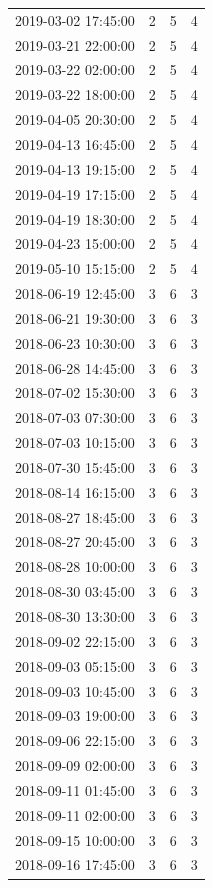 \begin{tabular}{lrrr}
2019-03-02 17:45:00 & 2 & 5 & 4 \\
2019-03-21 22:00:00 & 2 & 5 & 4 \\
2019-03-22 02:00:00 & 2 & 5 & 4 \\
2019-03-22 18:00:00 & 2 & 5 & 4 \\
2019-04-05 20:30:00 & 2 & 5 & 4 \\
2019-04-13 16:45:00 & 2 & 5 & 4 \\
2019-04-13 19:15:00 & 2 & 5 & 4 \\
2019-04-19 17:15:00 & 2 & 5 & 4 \\
2019-04-19 18:30:00 & 2 & 5 & 4 \\
2019-04-23 15:00:00 & 2 & 5 & 4 \\
2019-05-10 15:15:00 & 2 & 5 & 4 \\
2018-06-19 12:45:00 & 3 & 6 & 3 \\
2018-06-21 19:30:00 & 3 & 6 & 3 \\
2018-06-23 10:30:00 & 3 & 6 & 3 \\
2018-06-28 14:45:00 & 3 & 6 & 3 \\
2018-07-02 15:30:00 & 3 & 6 & 3 \\
2018-07-03 07:30:00 & 3 & 6 & 3 \\
2018-07-03 10:15:00 & 3 & 6 & 3 \\
2018-07-30 15:45:00 & 3 & 6 & 3 \\
2018-08-14 16:15:00 & 3 & 6 & 3 \\
2018-08-27 18:45:00 & 3 & 6 & 3 \\
2018-08-27 20:45:00 & 3 & 6 & 3 \\
2018-08-28 10:00:00 & 3 & 6 & 3 \\
2018-08-30 03:45:00 & 3 & 6 & 3 \\
2018-08-30 13:30:00 & 3 & 6 & 3 \\
2018-09-02 22:15:00 & 3 & 6 & 3 \\
2018-09-03 05:15:00 & 3 & 6 & 3 \\
2018-09-03 10:45:00 & 3 & 6 & 3 \\
2018-09-03 19:00:00 & 3 & 6 & 3 \\
2018-09-06 22:15:00 & 3 & 6 & 3 \\
2018-09-09 02:00:00 & 3 & 6 & 3 \\
2018-09-11 01:45:00 & 3 & 6 & 3 \\
2018-09-11 02:00:00 & 3 & 6 & 3 \\
2018-09-15 10:00:00 & 3 & 6 & 3 \\
2018-09-16 17:45:00 & 3 & 6 & 3 \\

\end{tabular}
